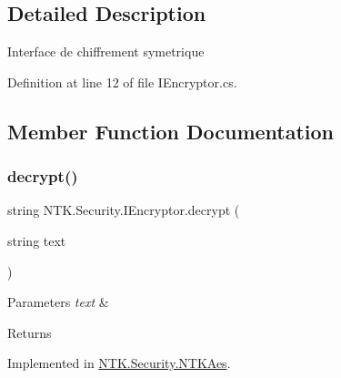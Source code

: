 \subsection{Detailed Description}
Interface de chiffrement symetrique 



Definition at line 12 of file I\+Encryptor.\+cs.



\subsection{Member Function Documentation}
\mbox{\label{interface_n_t_k_1_1_security_1_1_i_encryptor_a036ade24943e0fe14d7dbc9637015a0f}} 
\subsubsection{\texorpdfstring{decrypt()}{decrypt()}\hspace{0.1cm}{\footnotesize\ttfamily [1/2]}}
{\footnotesize\ttfamily string N\+T\+K.\+Security.\+I\+Encryptor.\+decrypt (\begin{DoxyParamCaption}\item[{string}]{text }\end{DoxyParamCaption})}






\begin{DoxyParams}{Parameters}
{\em text} & \\
\hline
\end{DoxyParams}
\begin{DoxyReturn}{Returns}

\end{DoxyReturn}


Implemented in \mbox{\hyperlink{class_n_t_k_1_1_security_1_1_n_t_k_aes_a4f70eed096e2d3e59c4a848f66289371}{N\+T\+K.\+Security.\+N\+T\+K\+Aes}}.

\mbox{\label{interface_n_t_k_1_1_security_1_1_i_encryptor_a90100151bcdff754395c3cc801438a1a}} 
